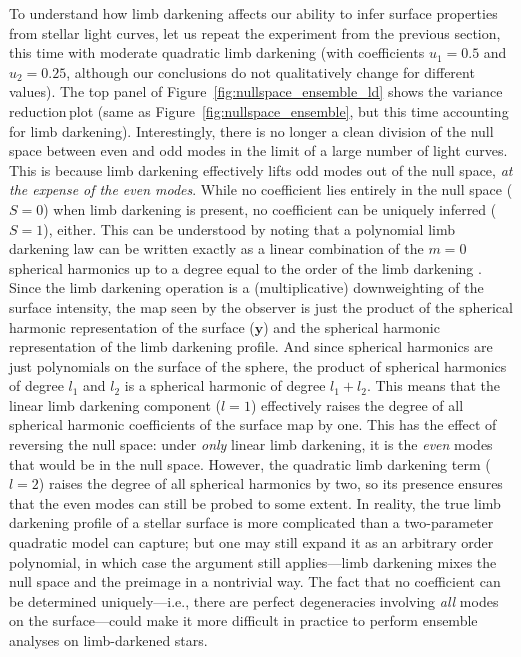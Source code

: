\documentclass[modern,linenumbers]{aastex62}
\newcommand{\shrinkage}{{variance reduction\,}}
\begin{document}
To understand how limb darkening affects our ability to infer
surface properties from stellar light curves,
let us repeat the experiment from the previous section,
this time with moderate quadratic limb darkening (with coefficients
$u_1 = 0.5$ and $u_2 = 0.25$, although our conclusions do not
qualitatively change for different values).
The top panel of Figure~\ref{fig:nullspace_ensemble_ld} shows the
\shrinkage plot (same as Figure~\ref{fig:nullspace_ensemble}, but
this time accounting for limb darkening). Interestingly, there is no longer a clean division of
the null space between even and odd modes in the limit of a large number
of light curves.
This is because limb darkening effectively lifts odd modes out of the null space, \emph{at the
    expense of the even modes}. While no coefficient lies entirely in the
null space ($S = 0$) when limb darkening is present, no coefficient
can be uniquely inferred ($S = 1$), either. This can be understood by noting that
a polynomial limb darkening law can be written
exactly as a linear combination of the $m=0$ spherical harmonics
up to a degree equal to the order of the limb darkening
\citep[in this case, $l = 2$;]{Luger2019,Agol2020}.
Since the limb darkening operation is a (multiplicative) downweighting of
the surface intensity, the map seen by the observer is just the product
of the spherical harmonic representation of the surface ($\mathbf{y}$)
and the spherical harmonic representation of the limb darkening profile.
And since spherical harmonics are just polynomials on the surface of the sphere,
the product of spherical harmonics of degree $l_1$ and $l_2$ is a spherical
harmonic of degree $l_1 + l_2$. This means that the linear limb darkening
component ($l = 1$) effectively raises the degree of all spherical harmonic
coefficients of the surface map by one. This has the effect of reversing
the null space: under \emph{only} linear limb darkening, it is the \emph{even}
modes that would be in the null space. However, the quadratic
limb darkening term ($l = 2$) raises the degree of all spherical harmonics by two,
so its presence ensures that the even modes can still be probed to some extent.
In reality, the true limb darkening profile of a stellar surface is more
complicated than a two-parameter quadratic model can capture; but one may still
expand it as an arbitrary order polynomial, in which case the argument still
applies---limb darkening mixes the null space and the preimage in a nontrivial
way.
%
The fact that no coefficient can be determined uniquely---i.e., there are
perfect degeneracies involving \emph{all} modes on the surface---could make it more
difficult in practice to perform ensemble analyses on limb-darkened stars.
\end{document}
